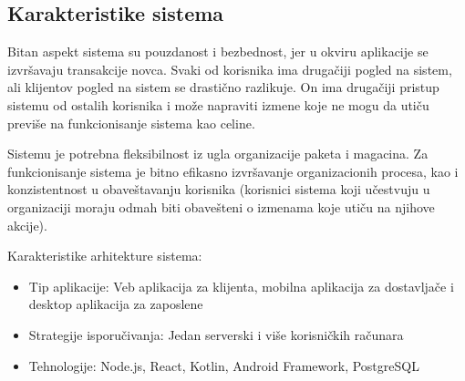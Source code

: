 \subsection{Karakteristike sistema}

Bitan aspekt sistema su pouzdanost i bezbednost, jer u okviru aplikacije se izvršavaju transakcije novca.
Svaki od korisnika ima drugačiji pogled na sistem, ali klijentov pogled na sistem se drastično razlikuje. On ima drugačiji pristup sistemu od ostalih korisnika i može napraviti izmene koje ne mogu da utiču previše na funkcionisanje sistema kao celine. 

Sistemu je potrebna fleksibilnost iz ugla organizacije paketa i magacina. Za funkcionisanje sistema je bitno efikasno izvršavanje organizacionih procesa, kao i konzistentnost u obaveštavanju korisnika (korisnici sistema koji učestvuju u organizaciji moraju odmah biti obavešteni o izmenama koje utiču na njihove akcije).

Karakteristike arhitekture sistema:
\begin{itemize}
    \item Tip aplikacije: Veb aplikacija za klijenta, mobilna aplikacija za dostavljače i desktop aplikacija za zaposlene
    \item Strategije isporučivanja: Jedan serverski i više korisničkih računara
    \item Tehnologije: Node.js, React, Kotlin, Android Framework, PostgreSQL
\end{itemize}

